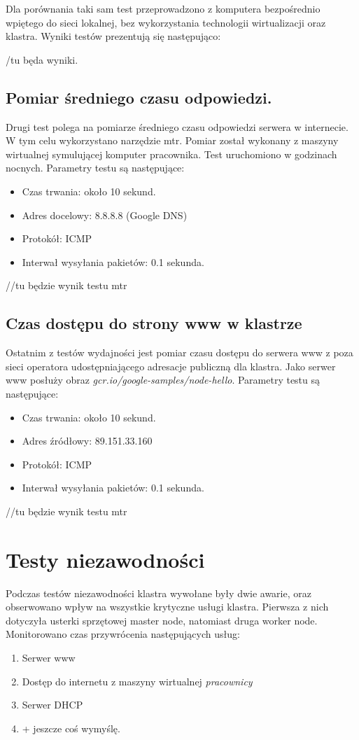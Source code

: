 \documentclass[pl,final,oneside]{mgr} %
\begin{document}
Dla porównania taki sam test przeprowadzono z komputera bezpośrednio wpiętego do sieci lokalnej, bez wykorzystania technologii wirtualizacji oraz klastra. Wyniki testów prezentują się następująco:

/tu będa wyniki.

\subsection{Pomiar średniego czasu odpowiedzi.}
Drugi test polega na pomiarze średniego czasu odpowiedzi serwera w internecie. W tym celu wykorzystano narzędzie mtr. Pomiar został wykonany z maszyny wirtualnej symulującej komputer pracownika. Test uruchomiono w godzinach nocnych. Parametry testu są następujące:
\begin{itemize}
	\item Czas trwania: około 10 sekund.
	\item Adres docelowy: 8.8.8.8 (Google DNS)
	\item Protokół: ICMP
	\item Interwał wysyłania pakietów: 0.1 sekunda.
\end{itemize}

//tu będzie wynik testu mtr

\subsection{Czas dostępu do strony www w klastrze}
Ostatnim z testów wydajności jest pomiar czasu dostępu do serwera www z poza sieci operatora udostępniającego adresacje publiczną dla klastra. Jako serwer www posłuży obraz \textit{gcr.io/google-samples/node-hello}.
Parametry testu są następujące:
\begin{itemize}
	\item Czas trwania: około 10 sekund.
	\item Adres źródłowy: 89.151.33.160
	\item Protokół: ICMP
	\item Interwał wysyłania pakietów: 0.1 sekunda.
\end{itemize}
//tu będzie wynik testu mtr



\section{Testy niezawodności}
Podczas testów niezawodności klastra wywołane były dwie awarie, oraz obserwowano wpływ na wszystkie krytyczne usługi klastra. Pierwsza z nich dotyczyła usterki sprzętowej master node, natomiast druga worker node. Monitorowano czas przywrócenia następujących usług:
\begin{enumerate}
	\item Serwer www
	\item Dostęp do internetu z maszyny wirtualnej \textit{pracownicy}
	\item Serwer DHCP
	\item + jeszcze coś wymyślę.
\end{enumerate}
\end{document}
